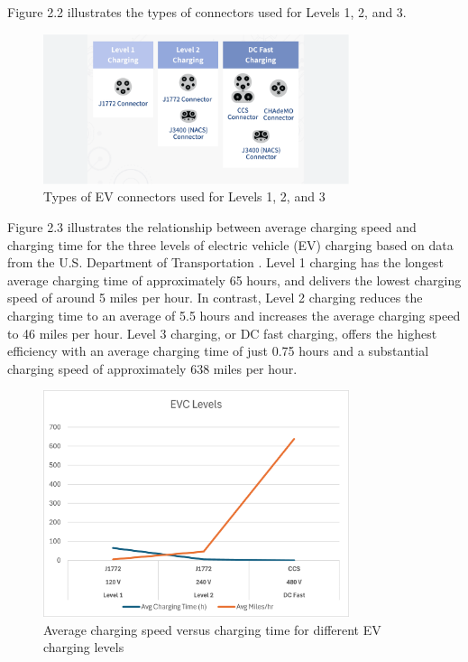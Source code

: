 Figure 2.2 illustrates the types of connectors used for Levels 1, 2, and 3.


\begin{figure}[h]
    \centering
    \includegraphics[width=0.8\textwidth]{../Figures/EV_connecters.PNG}
    \caption{Types of EV connectors used for Levels 1, 2, and 3 \cite{Alternative Fuels Data Center}}
    \label{fig:EV connectors}
\end{figure}

\clearpage
Figure 2.3 illustrates the relationship between average charging speed and charging time for the three levels of electric vehicle (EV) charging based on data from the U.S. Department of Transportation \cite{U.S. Department of Transportation}. Level 1 charging has the longest average charging time of approximately 65 hours, and delivers the lowest charging speed of around 5 miles per hour. In contrast, Level 2 charging reduces the charging time to an average of 5.5 hours and increases the average charging speed to 46 miles per hour. Level 3 charging, or DC fast charging, offers the highest efficiency with an average charging time of just 0.75 hours and a substantial charging speed of approximately 638 miles per hour. 

\begin{figure}[h]
    \centering
    \includegraphics[width=0.8\textwidth]{../Figures/EVC_Levels.png}
    \caption{Average charging speed versus charging time for different EV charging levels}
    \label{fig:EVC Levels}
\end{figure}


